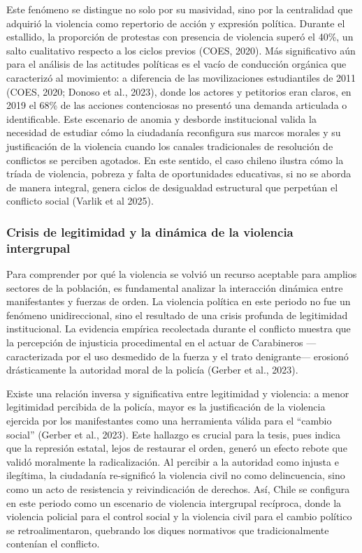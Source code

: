 \documentclass[
  13pt,
]{article}
\begin{document}
Este fenómeno se distingue no solo por su masividad, sino por la
centralidad que adquirió la violencia como repertorio de acción y
expresión política. Durante el estallido, la proporción de protestas con
presencia de violencia superó el 40\%, un salto cualitativo respecto a
los ciclos previos (COES, 2020). Más significativo aún para el análisis
de las actitudes políticas es el vacío de conducción orgánica que
caracterizó al movimiento: a diferencia de las movilizaciones
estudiantiles de 2011 (COES, 2020; Donoso et al., 2023), donde los
actores y petitorios eran claros, en 2019 el 68\% de las acciones
contenciosas no presentó una demanda articulada o identificable. Este
escenario de anomia y desborde institucional valida la necesidad de
estudiar cómo la ciudadanía reconfigura sus marcos morales y su
justificación de la violencia cuando los canales tradicionales de
resolución de conflictos se perciben agotados. En este sentido, el caso
chileno ilustra cómo la tríada de violencia, pobreza y falta de
oportunidades educativas, si no se aborda de manera integral, genera
ciclos de desigualdad estructural que perpetúan el conflicto social
(Varlik et al 2025).

\subsubsection{Crisis de legitimidad y la dinámica de la violencia
intergrupal}\label{crisis-de-legitimidad-y-la-dinuxe1mica-de-la-violencia-intergrupal}

Para comprender por qué la violencia se volvió un recurso aceptable para
amplios sectores de la población, es fundamental analizar la interacción
dinámica entre manifestantes y fuerzas de orden. La violencia política
en este periodo no fue un fenómeno unidireccional, sino el resultado de
una crisis profunda de legitimidad institucional. La evidencia empírica
recolectada durante el conflicto muestra que la percepción de injusticia
procedimental en el actuar de Carabineros ---caracterizada por el uso
desmedido de la fuerza y el trato denigrante--- erosionó drásticamente
la autoridad moral de la policía (Gerber et al., 2023).

Existe una relación inversa y significativa entre legitimidad y
violencia: a menor legitimidad percibida de la policía, mayor es la
justificación de la violencia ejercida por los manifestantes como una
herramienta válida para el ``cambio social'' (Gerber et al., 2023). Este
hallazgo es crucial para la tesis, pues indica que la represión estatal,
lejos de restaurar el orden, generó un efecto rebote que validó
moralmente la radicalización. Al percibir a la autoridad como injusta e
ilegítima, la ciudadanía re-significó la violencia civil no como
delincuencia, sino como un acto de resistencia y reivindicación de
derechos. Así, Chile se configura en este periodo como un escenario de
violencia intergrupal recíproca, donde la violencia policial para el
control social y la violencia civil para el cambio político se
retroalimentaron, quebrando los diques normativos que tradicionalmente
contenían el conflicto.
\end{document}
